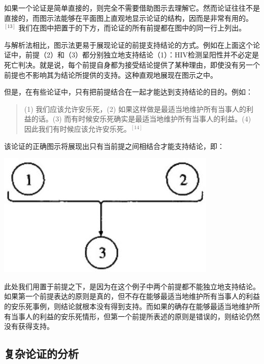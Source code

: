 如果一个论证是简单直接的，则完全不需要借助图示去理解它。然而论证往往不是直接的，而图示法能够在平面图上直观地显示论证的结构，因而是非常有用的。${}^{[13]}$ 我们在图中把置于的下方，而论证的所有前提都在图中的同一行上列出。

与解析法相比，图示法更易于展现论证的前提支持结论的方式。例如在上面这个论证中，前提（2）和（3）都分别独立地支持结论（1）：HIV检测呈阳性并不必定是死亡判决。就是说，每个前提自身都为接受结论提供了某种理由，即使没有另一个前提也不影响其为结论所提供的支持。这种直观地展现在图示之中。

但是，在有些论证中，只有把前提结合在一起才能达到支持结论的目的。例如：

\begin{quotation}
(1) 我们应该允许安乐死，(2) 如果这样做是最适当地维护所有当事人的利益的话。(3) 而有时候安乐死确实是最适当地维护所有当事人的利益。(4) 因此我们有时候应该允许安乐死。${}^{[14]}$
\end{quotation}

该论证的正确图示将展现出只有当前提之间相结合才能支持结论，即：

\begin{center}
\includegraphics[width=\textwidth]{images/2025_05_15_6a28331d5e7c993ad07ag-031(1).jpg}
\end{center}

此处我们用置于前提之下，是因为在这个例子中两个前提都不能独立地支持结论。如果第一个前提表达的原则是真的，但不存在能够最适当地维护所有当事人的利益的安乐死事例，则结论就根本没有得到支持。而如果的确存在能够最适当地维护所有当事人的利益的安乐死情形，但第一个前提所表述的原则是错误的，则结论仍然没有获得支持。

\subsection{复杂论证的分析}

